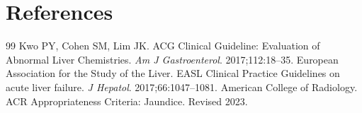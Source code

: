 \section*{References}
\begin{thebibliography}{99}
 Kwo PY, Cohen SM, Lim JK. ACG Clinical Guideline: Evaluation of Abnormal Liver Chemistries. \textit{Am J Gastroenterol}. 2017;112:18--35.
 European Association for the Study of the Liver. EASL Clinical Practice Guidelines on acute liver failure. \textit{J Hepatol}. 2017;66:1047--1081.
 American College of Radiology. ACR Appropriateness Criteria: Jaundice. Revised 2023.
\end{thebibliography}
